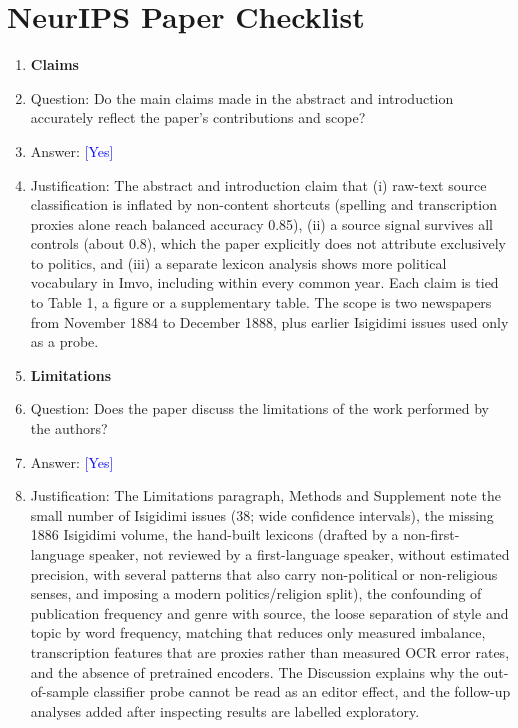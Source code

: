 \newcommand{\answerYes}[1][]{\textcolor{blue}{[Yes] #1}}
\newcommand{\answerNo}[1][]{\textcolor{orange}{[No] #1}}
\newcommand{\answerNA}[1][]{\textcolor{gray}{[NA] #1}}

\section*{NeurIPS Paper Checklist}
\begin{enumerate}

\item {\bf Claims}
    \item[] Question: Do the main claims made in the abstract and introduction accurately reflect the paper's contributions and scope?
    \item[] Answer: \answerYes{}
    \item[] Justification: The abstract and introduction claim that (i) raw-text source classification is inflated by non-content shortcuts (spelling and transcription proxies alone reach balanced accuracy 0.85), (ii) a source signal survives all controls (about 0.8), which the paper explicitly does not attribute exclusively to politics, and (iii) a separate lexicon analysis shows more political vocabulary in Imvo, including within every common year. Each claim is tied to Table 1, a figure or a supplementary table. The scope is two newspapers from November 1884 to December 1888, plus earlier Isigidimi issues used only as a probe.

\item {\bf Limitations}
    \item[] Question: Does the paper discuss the limitations of the work performed by the authors?
    \item[] Answer: \answerYes{}
    \item[] Justification: The Limitations paragraph, Methods and Supplement note the small number of Isigidimi issues (38; wide confidence intervals), the missing 1886 Isigidimi volume, the hand-built lexicons (drafted by a non-first-language speaker, not reviewed by a first-language speaker, without estimated precision, with several patterns that also carry non-political or non-religious senses, and imposing a modern politics/religion split), the confounding of publication frequency and genre with source, the loose separation of style and topic by word frequency, matching that reduces only measured imbalance, transcription features that are proxies rather than measured OCR error rates, and the absence of pretrained encoders. The Discussion explains why the out-of-sample classifier probe cannot be read as an editor effect, and the follow-up analyses added after inspecting results are labelled exploratory.


\end{enumerate}
